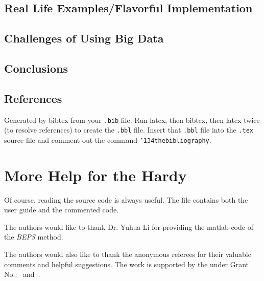 \documentclass[sigconf]{acmart}
\begin{document}
\subsection{Real Life Examples/Flavorful Implementation}
\subsection{Challenges of Using Big Data}
\subsection{Conclusions}
\subsection{References}

Generated by bibtex from your \texttt{.bib} file.  Run latex, then
bibtex, then latex twice (to resolve references) to create the
\texttt{.bbl} file.  Insert that \texttt{.bbl} file into the
\texttt{.tex} source file and comment out the command
\texttt{{\char'134}thebibliography}.


\section{More Help for the Hardy}

Of course, reading the source code is always useful.  The file
 contains both the user guide and the commented code.

\begin{acks}

  The authors would like to thank Dr. Yuhua Li for providing the
  matlab code of the \textit{BEPS} method.

  The authors would also like to thank the anonymous referees for
  their valuable comments and helpful suggestions. The work is
  supported by the  under Grant
  No.:~
  and~.

\end{acks}


 
\end{document}
